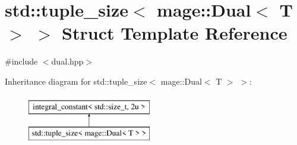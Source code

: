 \hypertarget{structstd_1_1tuple__size_3_01mage_1_1_dual_3_01_t_01_4_01_4}{}\section{std\+:\+:tuple\+\_\+size$<$ mage\+:\+:Dual$<$ T $>$ $>$ Struct Template Reference}
\label{structstd_1_1tuple__size_3_01mage_1_1_dual_3_01_t_01_4_01_4}


{\ttfamily \#include $<$dual.\+hpp$>$}

Inheritance diagram for std\+:\+:tuple\+\_\+size$<$ mage\+:\+:Dual$<$ T $>$ $>$\+:\begin{figure}[H]
\begin{center}
\leavevmode
\includegraphics[height=2.000000cm]{structstd_1_1tuple__size_3_01mage_1_1_dual_3_01_t_01_4_01_4}
\end{center}
\end{figure}
